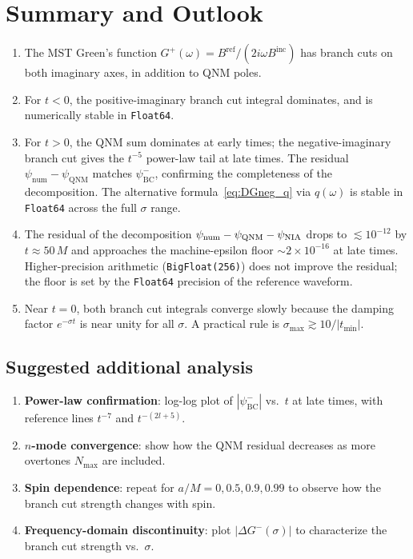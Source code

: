 \documentclass[12pt,a4paper]{article}
\newcommand{\Binc}{B^{\mathrm{inc}}}
\newcommand{\Bref}{B^{\mathrm{ref}}}
\newcommand{\psiQNM}{\psi_{\mathrm{QNM}}}
\begin{document}
\section{Summary and Outlook}

\begin{enumerate}
  \item The MST Green's function $G^+(\omega) = \Bref/(2i\omega\Binc)$
        has branch cuts on both imaginary axes, in addition to QNM poles.
  \item For $t < 0$, the positive-imaginary branch cut integral dominates,
        and is numerically stable in \texttt{Float64}.
  \item For $t > 0$, the QNM sum dominates at early times; the negative-imaginary
        branch cut gives the $t^{-5}$ power-law tail at late times.
        The residual $\psi_{\mathrm{num}} - \psiQNM$ matches $\psi_{\mathrm{BC}}^-$,
        confirming the completeness of the decomposition.
        The alternative formula~\eqref{eq:DGneg_q} via $q(\omega)$ is
        stable in \texttt{Float64} across the full $\sigma$ range.
  \item The residual of the decomposition
        $\psi_{\rm num} - \psi_{\rm QNM} - \psi_{\rm NIA}$ drops to
        $\lesssim 10^{-12}$ by $t \approx 50\,M$ and approaches the
        machine-epsilon floor $\sim 2 \times 10^{-16}$ at late times.
        Higher-precision arithmetic (\texttt{BigFloat(256)}) does not
        improve the residual; the floor is set by the \texttt{Float64}
        precision of the reference waveform.
  \item Near $t = 0$, both branch cut integrals converge slowly because the
        damping factor $e^{-\sigma t}$ is near unity for all $\sigma$.
        A practical rule is $\sigma_{\max} \gtrsim 10/|t_{\min}|$.
\end{enumerate}

\subsection*{Suggested additional analysis}

\begin{enumerate}
  \item \textbf{Power-law confirmation}: log-log plot of $|\psi_{\mathrm{BC}}^-|$
        vs.\ $t$ at late times, with reference lines $t^{-7}$ and $t^{-(2l+5)}$.
  \item \textbf{$n$-mode convergence}: show how the QNM residual decreases
        as more overtones $N_{\max}$ are included.
  \item \textbf{Spin dependence}: repeat for $a/M = 0, 0.5, 0.9, 0.99$
        to observe how the branch cut strength changes with spin.
  \item \textbf{Frequency-domain discontinuity}: plot $|\Delta G^-(\sigma)|$
        to characterize the branch cut strength vs.\ $\sigma$.
\end{enumerate}
\end{document}
